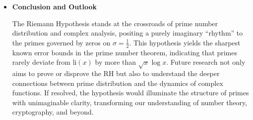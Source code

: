 \documentclass{article}
\begin{document}
\begin{itemize}
    \item \textbf{Conclusion and Outlook}
    \par
    The Riemann Hypothesis stands at the crossroads of prime number distribution and complex analysis, positing a purely imaginary “rhythm” to the primes governed by zeros on $\sigma = \tfrac12$. This hypothesis yields the sharpest known error bounds in the prime number theorem, indicating that primes rarely deviate from $\text{li}(x)$ by more than $\sqrt{x}\log x$. Future research not only aims to prove or disprove the RH but also to understand the deeper connections between prime distribution and the dynamics of complex functions. If resolved, the hypothesis would illuminate the structure of primes with unimaginable clarity, transforming our understanding of number theory, cryptography, and beyond.
\end{itemize}

\begin{center}
\end{center}
\end{document}
